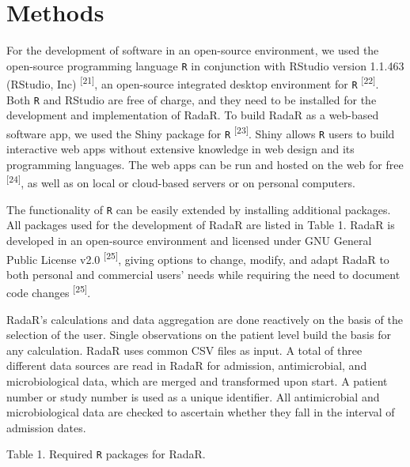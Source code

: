 \documentclass[
]{book}
\begin{document}
\hypertarget{methods}{%
\section{Methods}\label{methods}}

For the development of software in an open-source environment, we used the open-source programming language \texttt{R} in conjunction with RStudio version 1.1.463 (RStudio, Inc) \textsuperscript{{[}21{]}}, an open-source integrated desktop environment for \texttt{R} \textsuperscript{{[}22{]}}. Both \texttt{R} and RStudio are free of charge, and they need to be installed for the development and implementation of RadaR. To build RadaR as a web-based software app, we used the Shiny package for \texttt{R} \textsuperscript{{[}23{]}}. Shiny allows \texttt{R} users to build interactive web apps without extensive knowledge in web design and its programming languages. The web apps can be run and hosted on the web for free \textsuperscript{{[}24{]}}, as well as on local or cloud-based servers or on personal computers.

The functionality of \texttt{R} can be easily extended by installing additional packages. All packages used for the development of RadaR are listed in Table 1. RadaR is developed in an open-source environment and licensed under GNU General Public License v2.0 \textsuperscript{{[}25{]}}, giving options to change, modify, and adapt RadaR to both personal and commercial users' needs while requiring the need to document code changes \textsuperscript{{[}25{]}}.

RadaR's calculations and data aggregation are done reactively on the basis of the selection of the user. Single observations on the patient level build the basis for any calculation. RadaR uses common CSV files as input. A total of three different data sources are read in RadaR for admission, antimicrobial, and microbiological data, which are merged and transformed upon start. A patient number or study number is used as a unique identifier. All antimicrobial and microbiological data are checked to ascertain whether they fall in the interval of admission dates.

Table 1. Required \texttt{R} packages for RadaR.
\end{document}
